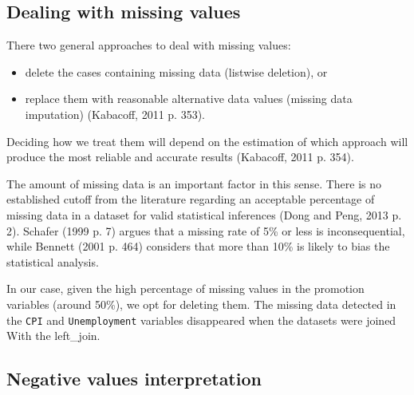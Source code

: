 \documentclass[11pt,]{article}
\newenvironment{Shaded}{\begin{snugshade}}{\end{snugshade}}
\newcommand{\StringTok}[1]{\textcolor[rgb]{0.31,0.60,0.02}{{#1}}}
\newcommand{\CommentTok}[1]{\textcolor[rgb]{0.56,0.35,0.01}{\textit{{#1}}}}
\newcommand{\OtherTok}[1]{\textcolor[rgb]{0.56,0.35,0.01}{{#1}}}
\newcommand{\NormalTok}[1]{{#1}}
\begin{document}
\subsection{Dealing with missing
values}\label{dealing-with-missing-values}

There two general approaches to deal with missing values:

\begin{itemize}
\item
  delete the cases containing missing data (listwise deletion), or
\item
  replace them with reasonable alternative data values (missing data
  imputation) (Kabacoff, 2011 p. 353).
\end{itemize}

Deciding how we treat them will depend on the estimation of which
approach will produce the most reliable and accurate results (Kabacoff,
2011 p. 354).

The amount of missing data is an important factor in this sense. There
is no established cutoff from the literature regarding an acceptable
percentage of missing data in a dataset for valid statistical inferences
(Dong and Peng, 2013 p. 2). Schafer (1999 p. 7) argues that a missing
rate of 5\% or less is inconsequential, while Bennett (2001 p. 464)
considers that more than 10\% is likely to bias the statistical
analysis.

In our case, given the high percentage of missing values in the
promotion variables (around 50\%), we opt for deleting them. The missing
data detected in the \texttt{CPI} and \texttt{Unemployment} variables
disappeared when the datasets were joined With the left\_join.

\pagebreak

\begin{Shaded}
\end{Shaded}

\subsection{Negative values
interpretation}\label{negative-values-interpretation}
\end{document}
